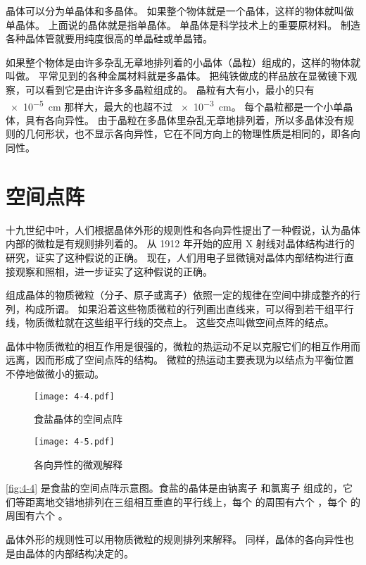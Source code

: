 晶体可以分为单晶体和多晶体。
如果整个物体就是一个晶体，这样的物体就叫做单晶体。
上面说的晶体就是指单晶体。
单晶体是科学技术上的重要原材料。
制造各种晶体管就要用纯度很高的单晶硅或单晶锗。

如果整个物体是由许多杂乱无章地排列着的小晶体（晶粒）组成的，这样的物体就叫做。
平常见到的各种金属材料就是多晶体。
把纯铁做成的样品放在显微镜下观察，可以看到它是由许许多多晶粒组成的。
晶粒有大有小，最小的只有 \qty{e-5}{cm} 那样大，最大的也超不过 \qty{e-3}{cm}。
每个晶粒都是一个小单晶体，具有各向异性。
由于晶粒在多晶体里杂乱无章地排列着，所以多晶体没有规则的几何形状，也不显示各向异性，它在不同方向上的物理性质是相同的，即各向同性。

\section{空间点阵}
十九世纪中叶，人们根据晶体外形的规则性和各向异性提出了一种假说，认为晶体内部的微粒是有规则排列着的。
从 1912 年开始的应用 X 射线对晶体结构进行的研究，证实了这种假说的正确。
现在，人们用电子显微镜对晶体内部结构进行直接观察和照相，进一步证实了这种假说的正确。

组成晶体的物质微粒（分子、原子或离子）依照一定的规律在空间中排成整齐的行列，构成所谓。
如果沿着这些物质微粒的行列画出直线来，可以得到若干组平行线，物质微粒就在这些组平行线的交点上。
这些交点叫做空间点阵的结点。

晶体中物质微粒的相互作用是很强的，微粒的热运动不足以克服它们的相互作用而远离，因而形成了空间点阵的结构。
微粒的热运动主要表现为以结点为平衡位置不停地做微小的振动。
\begin{figure}
	\begin{minipage}[b]{0.48\linewidth}\centering
		\texttt{[image: 4-4.pdf]}
		\caption{食盐晶体的空间点阵}\label{fig:4-4}
	\end{minipage}
	\begin{minipage}[b]{0.48\linewidth}\centering
		\texttt{[image: 4-5.pdf]}
		\caption{各向异性的微观解释}\label{fig:4-5}
	\end{minipage}
\end{figure}

\cref{fig:4-4} 是食盐的空间点阵示意图。食盐的晶体是由钠离子  和氯离子  组成的，它们等距离地交错地排列在三组相互垂直的平行线上，每个  的周围有六个 ，每个  的周围有六个 。

晶体外形的规则性可以用物质微粒的规则排列来解释。
同样，晶体的各向异性也是由晶体的内部结构决定的。

